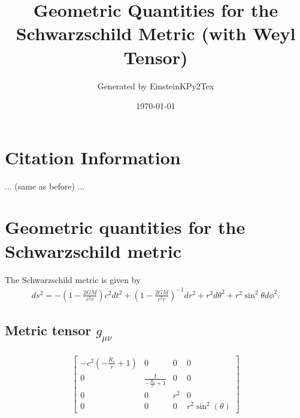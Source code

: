 \documentclass{article}
\begin{document}

\title{Geometric Quantities for the Schwarzschild Metric (with Weyl Tensor)}
\author{Generated by EinsteinKPy2Tex}
\date{\today}
\maketitle

\section{Citation Information}
... (same as before) ...

\section{Geometric quantities for the Schwarzschild metric}

The Schwarzschild metric is given by
\begin{align}
ds^2 = -\left(1-\frac{2GM}{c^2 r}\right) c^2 dt^2 + \left(1-\frac{2GM}{c^2 r}\right)^{-1} dr^2 + r^2 d\theta^2 + r^2 \sin^2\theta d\phi^2 .
\end{align}

\subsection{Metric tensor $g_{\mu\nu}$}
\begin{align}
\left[\begin{matrix}- c^{2} \left(- \frac{R_{s}}{r} + 1\right) & 0 & 0 & 0\\0 & \frac{1}{- \frac{R_{s}}{r} + 1} & 0 & 0\\0 & 0 & r^{2} & 0\\0 & 0 & 0 & r^{2} \sin^{2}{\left(\theta \right)}\end{matrix}\right]
\end{align}
\end{document}
